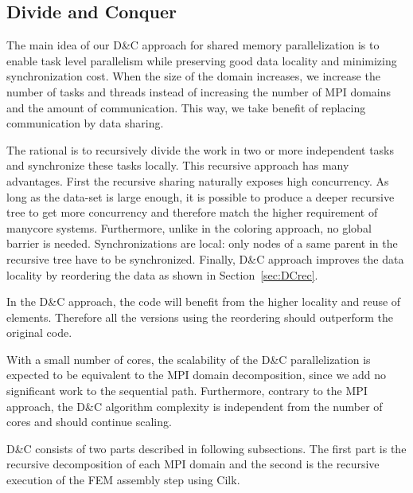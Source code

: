 \documentclass[10pt]{IOS-Book-Article}
\begin{document}
\subsection{Divide and Conquer}
\label{sec:dc}

The main idea of our D\&C approach for shared memory parallelization is to enable task level parallelism while preserving good data locality and minimizing synchronization cost.
When the size of the domain increases, we increase the number of tasks and threads instead of increasing the number of MPI domains and the amount of communication.
This way, we take benefit of replacing communication by data sharing.

The rational is to recursively divide the work in two or more independent tasks and synchronize these tasks locally.
This recursive approach has many advantages.
First the recursive sharing naturally exposes high concurrency.
As long as the data-set is large enough, it is possible to produce a deeper recursive tree to get more concurrency and therefore match the higher requirement of manycore systems.
Furthermore, unlike in the coloring approach, no global barrier is needed.
Synchronizations are local: only nodes of a same parent in the recursive tree have to be synchronized.
Finally, D\&C approach improves the data locality by reordering the data as shown in Section~\ref{sec:DCrec}.

In the D\&C approach, the code will benefit from the higher locality and reuse of elements.
Therefore all the versions using the reordering should outperform the original code.

With a small number of cores, the scalability of the D\&C parallelization is expected to be equivalent to the MPI domain decomposition, since we add no significant work to the sequential path.
Furthermore, contrary to the MPI approach, the D\&C algorithm complexity is independent from the number of cores and should continue scaling.


D\&C consists of two parts described in following subsections.
The first part is the recursive decomposition of each MPI domain and the second is the recursive execution of the FEM assembly step using Cilk.
\end{document}
